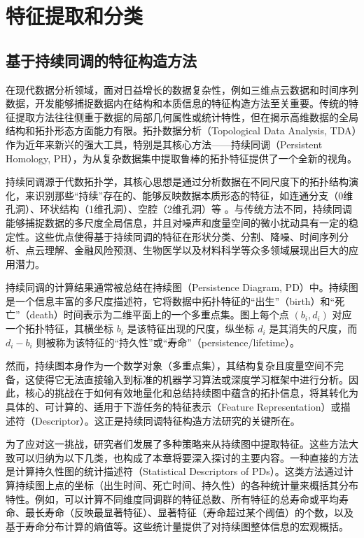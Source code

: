 \section{特征提取和分类} %
\label{chap:feature_extraction}


\subsection{基于持续同调的特征构造方法}
\label{sec:tda_features}
在现代数据分析领域，面对日益增长的数据复杂性，例如三维点云数据和时间序列数据，开发能够捕捉数据内在结构和本质信息的特征构造方法至关重要。传统的特征提取方法往往侧重于数据的局部几何属性或统计特性，但在揭示高维数据的全局结构和拓扑形态方面能力有限。拓扑数据分析（Topological Data Analysis, TDA）作为近年来新兴的强大工具，特别是其核心方法——持续同调（Persistent Homology, PH），为从复杂数据集中提取鲁棒的拓扑特征提供了一个全新的视角\cite{gao2021newell}。

持续同调源于代数拓扑学，其核心思想是通过分析数据在不同尺度下的拓扑结构演化，来识别那些“持续”存在的、能够反映数据本质形态的特征，如连通分支（0维孔洞）、环状结构（1维孔洞）、空腔（2维孔洞）等 。与传统方法不同，持续同调能够捕捉数据的多尺度全局信息，并且对噪声和度量空间的微小扰动具有一定的稳定性。这些优点使得基于持续同调的特征在形状分类、分割、降噪、时间序列分析、点云理解、金融风险预测、生物医学以及材料科学等众多领域展现出巨大的应用潜力。

持续同调的计算结果通常被总结在持续图（Persistence Diagram, PD）中。持续图是一个信息丰富的多尺度描述符，它将数据中拓扑特征的“出生”（birth）和“死亡”（death）时间表示为二维平面上的一个多重点集。图上每个点 $(b_i, d_i)$ 对应一个拓扑特征，其横坐标 $b_i$ 是该特征出现的尺度，纵坐标 $d_i$ 是其消失的尺度，而 $d_i - b_i$ 则被称为该特征的“持久性”或“寿命”（persistence/lifetime）。

然而，持续图本身作为一个数学对象（多重点集），其结构复杂且度量空间不完备，这使得它无法直接输入到标准的机器学习算法或深度学习框架中进行分析。因此，核心的挑战在于如何有效地量化和总结持续图中蕴含的拓扑信息，将其转化为具体的、可计算的、适用于下游任务的特征表示（Feature Representation）或描述符（Descriptor）。这正是持续同调特征构造方法研究的关键所在\cite{1021736289.nh}。

为了应对这一挑战，研究者们发展了多种策略来从持续图中提取特征。这些方法大致可以归纳为以下几类，也构成了本章将要深入探讨的主要内容。一种直接的方法是计算持久性图的统计描述符（Statistical Descriptors of PDs）。这类方法通过计算持续图上点的坐标（出生时间、死亡时间、持久性）的各种统计量来概括其分布特性。例如，可以计算不同维度同调群的特征总数、所有特征的总寿命或平均寿命、最长寿命（反映最显著特征）、显著特征（寿命超过某个阈值）的个数，以及基于寿命分布计算的熵值等。这些统计量提供了对持续图整体信息的宏观概括。


